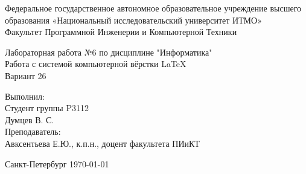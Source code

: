 \fontsize{14}{15}\selectfont

\begin{center}
	Федеральное государственное автономное образовательное учреждение
	высшего образования «Национальный исследовательский университет
	ИТМО» \\
	Факультет Программной Инженерии и Компьютерной Техники
\end{center}

\vspace{10cm}

\begin{center}
Лабораторная работа №6 по дисциплине "Информатика" \\
Работа с системой компьютерной вёрстки \LaTeX \\ 
Вариант 26
\end{center}

\vspace{6cm}

\begin{flushright}
	Выполнил:\\
	Студент группы P3112 \\
	Думцев В. С. \\
	Преподаватель: \\
	Авксентьева Е.Ю., к.п.н., доцент факультета ПИиКТ
\end{flushright}

\vspace{2cm}

\begin{center}
	Санкт-Петербург \currentyear\today
\end{center}
